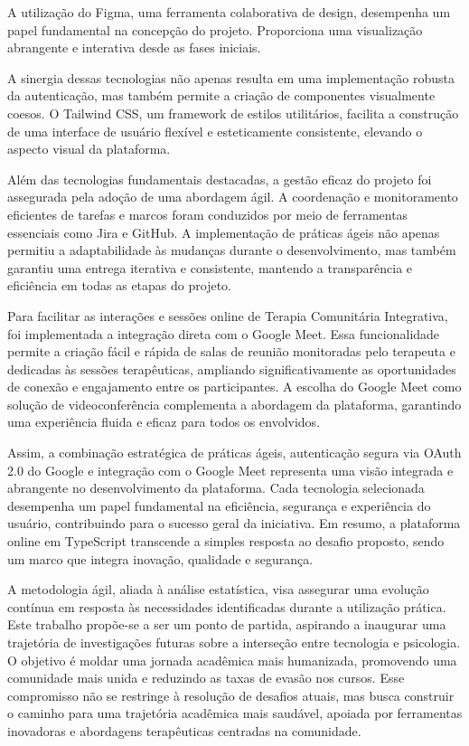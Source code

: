 A utilização do Figma, uma ferramenta colaborativa de design, desempenha um papel fundamental na concepção do projeto. Proporciona uma visualização abrangente e interativa desde as fases iniciais.

A sinergia dessas tecnologias não apenas resulta em uma implementação robusta da autenticação, mas também permite a criação de componentes visualmente coesos. O Tailwind CSS, um framework de estilos utilitários, facilita a construção de uma interface de usuário flexível e esteticamente consistente, elevando o aspecto visual da plataforma.

Além das tecnologias fundamentais destacadas, a gestão eficaz do projeto foi assegurada pela adoção de uma abordagem ágil. A coordenação e monitoramento eficientes de tarefas e marcos foram conduzidos por meio de ferramentas essenciais como Jira e GitHub. A implementação de práticas ágeis não apenas permitiu a adaptabilidade às mudanças durante o desenvolvimento, mas também garantiu uma entrega iterativa e consistente, mantendo a transparência e eficiência em todas as etapas do projeto.

Para facilitar as interações e sessões online de Terapia Comunitária Integrativa, foi implementada a integração direta com o Google Meet. Essa funcionalidade permite a criação fácil e rápida de salas de reunião monitoradas pelo terapeuta e dedicadas às sessões terapêuticas, ampliando significativamente as oportunidades de conexão e engajamento entre os participantes. A escolha do Google Meet como solução de videoconferência complementa a abordagem da plataforma, garantindo uma experiência fluida e eficaz para todos os envolvidos.

Assim, a combinação estratégica de práticas ágeis, autenticação segura via OAuth 2.0 do Google e integração com o Google Meet representa uma visão integrada e abrangente no desenvolvimento da plataforma. Cada tecnologia selecionada desempenha um papel fundamental na eficiência, segurança e experiência do usuário, contribuindo para o sucesso geral da iniciativa. Em resumo, a plataforma online em TypeScript transcende a simples resposta ao desafio proposto, sendo um marco que integra inovação, qualidade e segurança.

A metodologia ágil, aliada à análise estatística, visa assegurar uma evolução contínua em resposta às necessidades identificadas durante a utilização prática. Este trabalho propõe-se a ser um ponto de partida, aspirando a inaugurar uma trajetória de investigações futuras sobre a interseção entre tecnologia e psicologia. O objetivo é moldar uma jornada acadêmica mais humanizada, promovendo uma comunidade mais unida e reduzindo as taxas de evasão nos cursos. Esse compromisso não se restringe à resolução de desafios atuais, mas busca construir o caminho para uma trajetória acadêmica mais saudável, apoiada por ferramentas inovadoras e abordagens terapêuticas centradas na comunidade.


